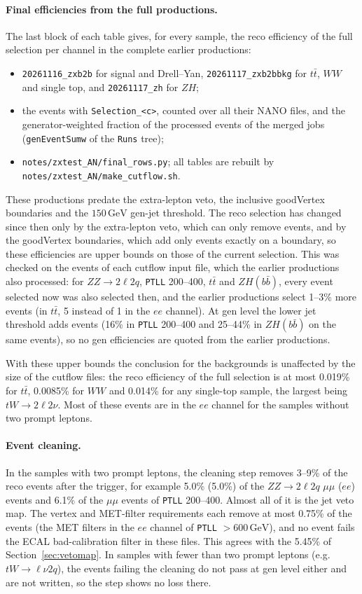 \documentclass[11pt]{article}
\newcommand{\GeV}{\ensuremath{\,\mathrm{GeV}}}
\newcommand{\code}[1]{\texttt{#1}}
\begin{document}
\paragraph{Final efficiencies from the full productions.} The last block of each table gives, for every sample, the
reco efficiency of the full selection per channel in the complete earlier productions:
\begin{itemize}
\item \code{20261116\_zxb2b} for signal and Drell--Yan, \code{20261117\_zxb2bbkg} for $t\bar t$, $WW$ and single top,
  and \code{20261117\_zh} for $ZH$;
\item the events with \code{Selection\_<c>}, counted over all their NANO files, and the generator-weighted fraction of
  the processed events of the merged jobs (\code{genEventSumw} of the \code{Runs} tree);
\item \code{notes/zxtest\_AN/final\_rows.py}; all tables are rebuilt by \code{notes/zxtest\_AN/make\_cutflow.sh}.
\end{itemize}
These productions predate the extra-lepton veto, the inclusive goodVertex boundaries and the $150\GeV$ gen-jet
threshold. The reco selection has changed since then only by the extra-lepton veto, which can only remove events,
and by the goodVertex boundaries, which add only events exactly on a boundary, so these efficiencies are upper bounds
on those of the current selection. This was checked on the events of each cutflow input file, which
the earlier productions also processed: for $ZZ\to2\ell2q$, \code{PTLL} 200--400, $t\bar t$ and $ZH(b\bar b)$, every
event selected now was also selected then, and the earlier productions select 1--3\% more events (in $t\bar t$, 5
instead of 1 in the $ee$ channel). At gen level the lower jet threshold adds events (16\% in \code{PTLL} 200--400 and
25--44\% in $ZH(b\bar b)$ on the same events), so no gen efficiencies are quoted from the earlier productions.

With these upper bounds the conclusion for the backgrounds is unaffected by the size of the cutflow files: the reco
efficiency of the full selection is at most 0.019\% for $t\bar t$, 0.0085\% for $WW$ and 0.014\% for any single-top
sample, the largest being $tW\to2\ell2\nu$. Most of these events are in the $ee$ channel for the samples without two
prompt leptons.

\paragraph{Event cleaning.} In the samples with two prompt leptons, the cleaning step removes 3--9\% of the reco events
after the trigger, for example 5.0\% (5.0\%) of the $ZZ\to2\ell2q$ $\mu\mu$ ($ee$) events and 6.1\% of the $\mu\mu$
events of \code{PTLL} 200--400. Almost all of it is the jet veto map. The vertex and MET-filter requirements each remove at most
0.75\% of the events (the MET filters in the $ee$ channel of \code{PTLL} $> 600\GeV$), and no event fails the ECAL
bad-calibration filter in these files. This agrees with the 5.45\%
of Section~\ref{sec:vetomap}. In samples with fewer than two prompt leptons (e.g.\ $tW\to\ell\nu2q$), the events
failing the cleaning do not pass at gen level either and are not written, so the step shows no loss there.
\end{document}
